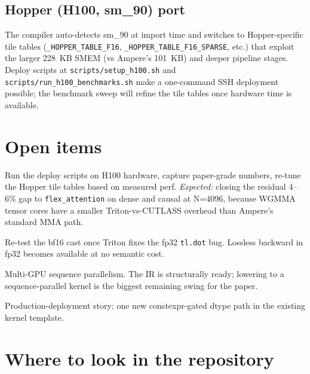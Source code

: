 \documentclass[11pt]{article}
\begin{document}
\subsection{Hopper (H100, sm\_90) port}

The compiler auto-detects sm\_90 at import time and switches to
Hopper-specific tile tables (\texttt{\_HOPPER\_TABLE\_F16},
\texttt{\_HOPPER\_TABLE\_F16\_SPARSE}, etc.) that exploit the larger
228~KB SMEM (vs Ampere's 101~KB) and deeper pipeline stages. Deploy
scripts at \texttt{scripts/setup\_h100.sh} and
\texttt{scripts/run\_h100\_benchmarks.sh} make a one-command SSH
deployment possible; the benchmark sweep will refine the tile tables
once hardware time is available.

\section{Open items}

\begin{description}[leftmargin=1.5em,itemsep=2pt]
  \item[H100 sweep] Run the deploy scripts on H100 hardware, capture
    paper-grade numbers, re-tune the Hopper tile tables based on
    measured perf. \emph{Expected:} closing the residual 4--6\% gap to
    \texttt{flex\_attention} on dense and causal at N=4096, because
    WGMMA tensor cores have a smaller Triton-vs-CUTLASS overhead than
    Ampere's standard MMA path.
  \item[Triton 3.2+] Re-test the bf16 cast once Triton fixes the fp32
    \texttt{tl.dot} bug. Lossless backward in fp32 becomes available
    at no semantic cost.
  \item[Ring attention] Multi-GPU sequence parallelism. The IR is
    structurally ready; lowering to a sequence-parallel kernel is the
    biggest remaining swing for the paper.
  \item[fp8 / int8 quantisation] Production-deployment story; one new
    constexpr-gated dtype path in the existing kernel template.
\end{description}

\section{Where to look in the repository}
\end{document}
